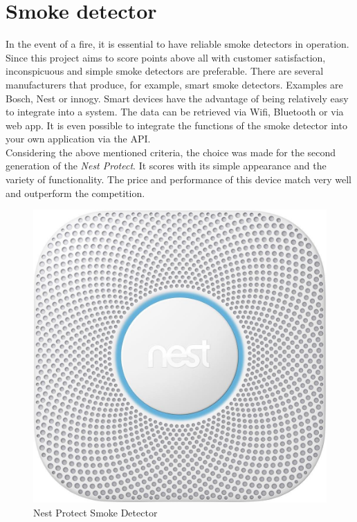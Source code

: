 \section{Smoke detector}
In the event of a fire, it is essential to have reliable smoke detectors in operation. Since this project aims to score points above all with customer satisfaction, inconspicuous and simple smoke detectors are preferable. There are several manufacturers that produce, for example, smart smoke detectors. Examples are Bosch, Nest or innogy. Smart devices have the advantage of being relatively easy to integrate into a system. The data can be retrieved via Wifi, Bluetooth or via web app. It is even possible to integrate the functions of the smoke detector into your own application via the API.
\\
Considering the above mentioned criteria, the choice was made for the second generation of the \textit{Nest Protect}. It scores with its simple appearance and the variety of functionality.  The price and performance of this device match very well and outperform the competition.

\begin{figure}[h]
	\centering
	\includegraphics[width=.4\textwidth]{images/CostAnalysis/NestProtect} 
	\caption{Nest Protect Smoke Detector}
	\label{fig:smokeDetection}
\end{figure}

